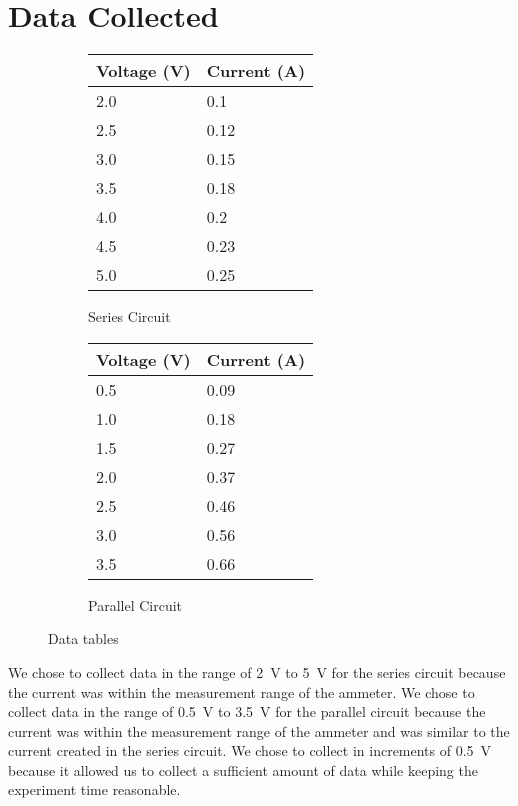 \documentclass{article}
\begin{document}
\section{Data Collected}

\begin{figure}[h]
    \centering
    \begin{subfigure}{0.4\textwidth}
        \begin{tabular}{ll}
            \toprule
            {Voltage (\si{\volt})} & {Current (\si{\ampere})} \\
            \midrule
            2.0 & 0.1 \\
            2.5 & 0.12 \\
            3.0 & 0.15 \\
            3.5 & 0.18 \\
            4.0 & 0.2 \\
            4.5 & 0.23 \\
            5.0 & 0.25 \\
            \bottomrule
        \end{tabular}
        \caption{Series Circuit}
    \end{subfigure}%
    \begin{subfigure}{0.4\textwidth}
        \begin{tabular}{ll}
            \toprule
            {Voltage (\si{\volt})} & {Current (\si{\ampere})} \\
            \midrule
            0.5 & 0.09 \\
            1.0 & 0.18 \\
            1.5 & 0.27 \\
            2.0 & 0.37 \\
            2.5 & 0.46 \\
            3.0 & 0.56 \\
            3.5 & 0.66 \\
            \bottomrule
        \end{tabular}
        \caption{Parallel Circuit}
    \end{subfigure}
    \caption{Data tables}
\end{figure}

We chose to collect data in the range of \SI{2}{\volt} to \SI{5}{\volt} for the
series circuit because the current was within the measurement range of the
ammeter. We chose to collect data in the range of \SI{0.5}{\volt} to
\SI{3.5}{\volt} for the parallel circuit because the current was within the
measurement range of the ammeter and was similar to the current created in the
series circuit. We chose to collect in increments of \SI{0.5}{\volt} because it
allowed us to collect a sufficient amount of data while keeping the experiment
time reasonable.
\end{document}
